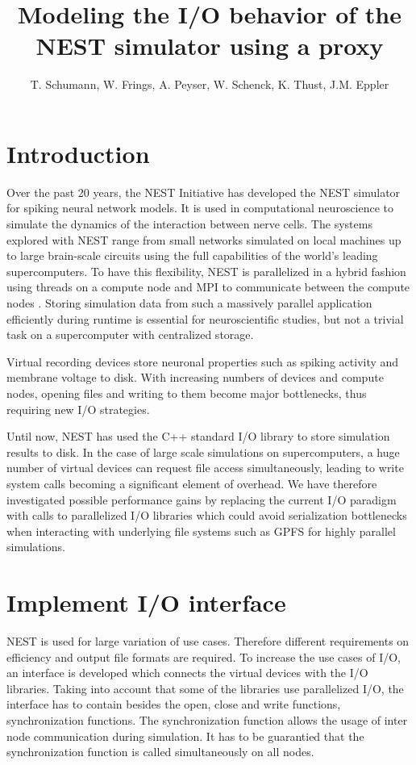 \documentclass[]{YIC2015}
\title{Modeling the I/O behavior of the NEST simulator using a proxy}
\author[T. Schumann et al.]{%
  T. Schumann\authref{a}\corref,
  W. Frings\authref{b},
  A. Peyser\authref{c},
  W. Schenck\authref{c},
  K. Thust\authref{b},
  J.M. Eppler\authref{c}
}
\begin{document}
\maketitle

\section{Introduction}
%
Over the past 20 years, the NEST Initiative \cite{NESTInitiative} has developed the NEST
\cite{NEST} simulator for spiking neural network models. It is used in
computational neuroscience to simulate the dynamics of the interaction
between nerve cells. The systems explored with NEST range from small
networks simulated on local machines up to large brain-scale circuits
using the full capabilities of the world's leading supercomputers. To
have this flexibility, NEST is parallelized in a hybrid fashion
using threads on a compute node and MPI to communicate between the
compute nodes \cite{Plesser07}.  Storing simulation data from such a
massively parallel application efficiently during runtime is essential
for neuroscientific studies, but not a trivial task on a supercomputer
with centralized storage.

Virtual recording devices store neuronal properties such as spiking activity
and membrane voltage to disk. With increasing numbers of devices and
compute nodes, opening files and writing to them become major bottlenecks, thus requiring
new I/O strategies.

Until now, NEST has used the C++ standard I/O library to store
simulation results to disk.  In the case of large scale simulations on
supercomputers, a huge number of virtual devices can request file
access simultaneously, leading to write system calls becoming a
significant element of overhead. We have therefore investigated
possible performance gains by replacing the current I/O paradigm with
calls to parallelized I/O libraries which could avoid serialization
bottlenecks when interacting with underlying file systems such as GPFS
\cite{GPFS} for highly parallel simulations.

\section{Implement I/O interface}
NEST is used for large variation of use cases.
Therefore different requirements on efficiency and output file formats are required.
To increase the use cases of I/O, an interface is developed which connects the virtual devices with the I/O libraries.
Taking into account that some of the libraries use parallelized I/O,
the interface has to contain besides the open,
close and write functions, synchronization functions.
The synchronization function allows the usage of inter node communication during simulation.
It has to be guarantied that the synchronization function is called simultaneously on all nodes.
\end{document}

